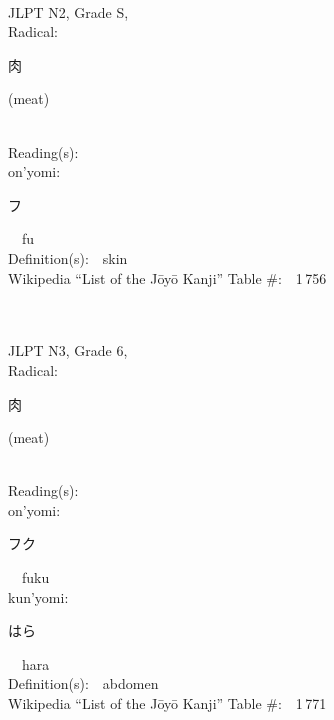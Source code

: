 \begin{multicols}{2}
{\fontsize{34pt}{40pt}  }\ \ \\  %
{JLPT N2, Grade S, \\Radical:\ \ {\begin{CJK}{UTF8}{min} 肉 \end{CJK}} (meat) } \\
Reading(s):\ \ \\
{\hspace*{1em}}on'yomi:\ \ \\
{\hspace*{2em}}{\begin{CJK}{UTF8}{min} フ \end{CJK}}\ \ fu\ \ \\
Definition(s):\ \ skin \\
Wikipedia ``List of the J\=oy\=o Kanji'' Table \#:\ \ 1\,756 \\
\ \ \\
{\fontsize{34pt}{40pt}  }\ \ \\  %
{JLPT N3, Grade 6, \\Radical:\ \ {\begin{CJK}{UTF8}{min} 肉 \end{CJK}} (meat) } \\
Reading(s):\ \ \\
{\hspace*{1em}}on'yomi:\ \ \\
{\hspace*{2em}}{\begin{CJK}{UTF8}{min} フク \end{CJK}}\ \ fuku\ \ \\
{\hspace*{1em}}kun'yomi:\ \ \\
{\hspace*{2em}}{\begin{CJK}{UTF8}{min} はら \end{CJK}}\ \ hara\ \ \\
Definition(s):\ \ abdomen \\
Wikipedia ``List of the J\=oy\=o Kanji'' Table \#:\ \ 1\,771 \\
\ \ \\
{\fontsize{34pt}{40pt}  }\ \ \\  %

\end{multicols}
